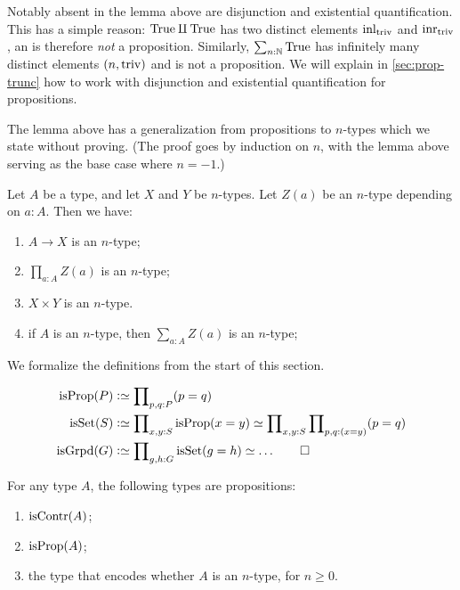 Notably absent in the lemma above are disjunction
and existential quantification. This has a simple reason:
$\mathrm{True}\amalg \mathrm{True}$ has two distinct elements
$\inl{\triv}$ and $\inr{\triv}$, an is therefore \emph{not} a proposition.
Similarly, $\sum_{n:\mathbb{N}} \mathrm{True}$ has infinitely many
distinct elements $(n,\mathrm{triv})$ and is not a proposition. We will explain 
in \cref{sec:prop-trunc} how to work with disjunction and 
existential quantification for propositions.

The lemma above has a generalization from propositions to
$n$-types which we state without proving.
(The proof goes by induction on $n$, with the lemma above serving as the base case where $n = -1$.)

\begin{lemma}\label{lem:level-n-utils}
Let $A$ be a type, and let $X$ and $Y$ be $n$-types.
Let $Z(a)$ be an $n$-type depending on $a:A$. Then we have:

\begin{enumerate}
\item\label{level-n-utils-codom} $A\to X$ is an $n$-type;
\item\label{level-n-utils-pi} $\prod_{a:A} Z(a)$ is an $n$-type;
\item\label{level-n-utils-times} $X\times Y$ is an $n$-type.
\item\label{level-n-utils-sum} if $A$ is an $n$-type, then $\sum_{a:A} Z(a)$ is an $n$-type;
\end{enumerate}
\end{lemma}

We formalize the definitions from the start of this section.
\begin{definition}\label{def:isSet}
\begin{align*}
\isprop(P) &\defeq\prod\nolimits_{p,q:P}(p=q)\\
\isset(S) &\defeq\prod\nolimits_{x,y:S}\isprop(x=y)\jdeq
                  \prod\nolimits_{x,y:S}\prod\nolimits_{p,q:(x=y)}(p=q)\\
\isgrpd(G) &\defeq\prod\nolimits_{g,h:G}\isset(g=h)\jdeq \ldots\qedhere
\end{align*}
\end{definition}
\begin{lemma}\label{lem:isX-is-prop}
  For any type $A$, the following types are propositions:
  \begin{enumerate}
    \item $\iscontr(A)$;
    \item $\isprop(A)$;
    \item the type that encodes whether $A$ is an $n$-type, for $n \ge 0$.
  \end{enumerate}
\end{lemma}

